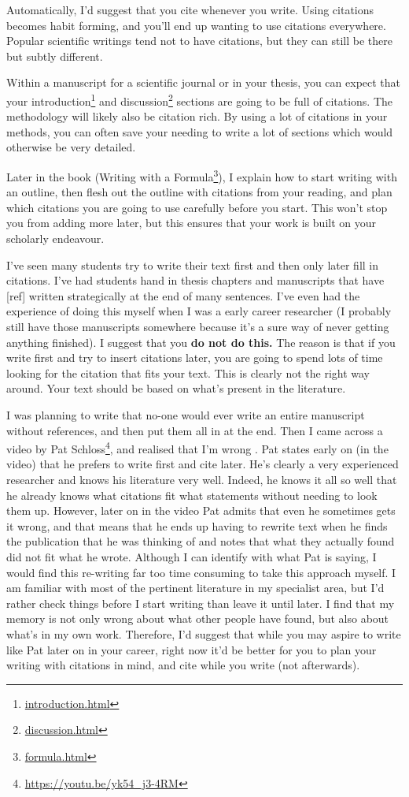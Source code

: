 \documentclass[
]{krantz}
\renewcommand{\href}[2]{#2\footnote{\url{#1}}}
\begin{document}
Automatically, I'd suggest that you cite whenever you write. Using citations becomes habit forming, and you'll end up wanting to use citations everywhere. Popular scientific writings tend not to have citations, but they can still be there but subtly different.

Within a manuscript for a scientific journal or in your thesis, you can expect that your \href{introduction.html}{introduction} and \href{discussion.html}{discussion} sections are going to be full of citations. The methodology will likely also be citation rich. By using a lot of citations in your methods, you can often save your needing to write a lot of sections which would otherwise be very detailed.

Later in the book (\href{formula.html}{Writing with a Formula}), I explain how to start writing with an outline, then flesh out the outline with citations from your reading, and plan which citations you are going to use carefully before you start. This won't stop you from adding more later, but this ensures that your work is built on your scholarly endeavour.

I've seen many students try to write their text first and then only later fill in citations. I've had students hand in thesis chapters and manuscripts that have {[}ref{]} written strategically at the end of many sentences. I've even had the experience of doing this myself when I was a early career researcher (I probably still have those manuscripts somewhere because it's a sure way of never getting anything finished). I suggest that you \textbf{do not do this.} The reason is that if you write first and try to insert citations later, you are going to spend lots of time looking for the citation that fits your text. This is clearly not the right way around. Your text should be based on what's present in the literature.

I was planning to write that no-one would ever write an entire manuscript without references, and then put them all in at the end. Then I came across a video by \href{https://youtu.be/yk54_j3-4RM}{Pat Schloss}, and realised that I'm wrong \citep{schloss2018riffomonas}. Pat states early on (in the video) that he prefers to write first and cite later. He's clearly a very experienced researcher and knows his literature very well. Indeed, he knows it all so well that he already knows what citations fit what statements without needing to look them up. However, later on in the video Pat admits that even he sometimes gets it wrong, and that means that he ends up having to rewrite text when he finds the publication that he was thinking of and notes that what they actually found did not fit what he wrote. Although I can identify with what Pat is saying, I would find this re-writing far too time consuming to take this approach myself. I am familiar with most of the pertinent literature in my specialist area, but I'd rather check things before I start writing than leave it until later. I find that my memory is not only wrong about what other people have found, but also about what's in my own work. Therefore, I'd suggest that while you may aspire to write like Pat later on in your career, right now it'd be better for you to plan your writing with citations in mind, and cite while you write (not afterwards).
\end{document}
